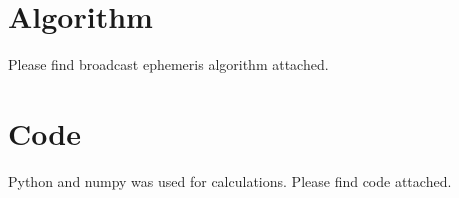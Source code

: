 \section {Algorithm}
Please find broadcast ephemeris algorithm attached.
\section {Code}
Python and numpy was used for calculations.
Please find code attached.



